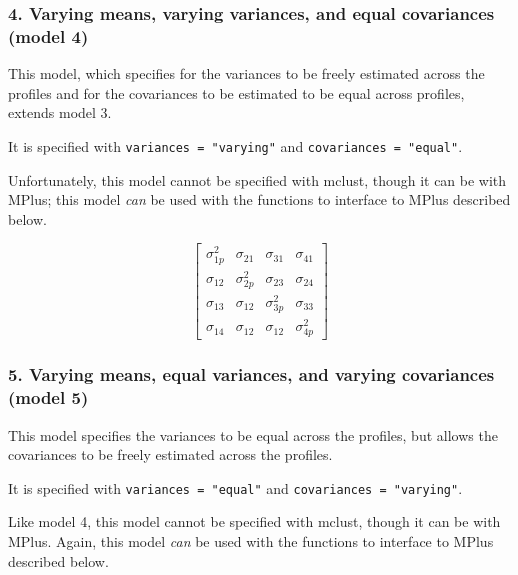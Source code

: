 \documentclass[man]{apa6}
\begin{document}
\hypertarget{varying-means-varying-variances-and-equal-covariances-model-4}{%
\subsubsection{4. Varying means, varying variances, and equal covariances (model 4)}\label{varying-means-varying-variances-and-equal-covariances-model-4}}

This model, which specifies for the variances to be freely estimated across the profiles and for the covariances to be estimated to be equal across profiles, extends model 3.

It is specified with \texttt{variances\ =\ "varying"} and \texttt{covariances\ =\ "equal"}.

Unfortunately, this model cannot be specified with mclust, though it can be with MPlus; this model \emph{can} be used with the functions to interface to MPlus described below.

\[
\left[ \begin{matrix} { \sigma  }_{ 1p }^{ 2 } & { \sigma  }_{ 21 } & { \sigma  }_{ 31 } & { \sigma  }_{ 41 } \\ { \sigma  }_{ 12 } & { \sigma  }_{ 2p }^{ 2 } & { \sigma  }_{ 23 } & { \sigma  }_{ 24 } \\ { \sigma  }_{ 13 } & { \sigma  }_{ 12 } & { \sigma  }_{ 3p }^{ 2 } & { \sigma  }_{ 33 } \\ { \sigma  }_{ 14 } & { \sigma  }_{ 12 } & { \sigma  }_{ 12 } & { \sigma  }_{ 4p }^{ 2 } \end{matrix} \right] 
\]

\hypertarget{varying-means-equal-variances-and-varying-covariances-model-5}{%
\subsubsection{5. Varying means, equal variances, and varying covariances (model 5)}\label{varying-means-equal-variances-and-varying-covariances-model-5}}

This model specifies the variances to be equal across the profiles, but allows the covariances to be freely estimated across the profiles.

It is specified with \texttt{variances\ =\ "equal"} and \texttt{covariances\ =\ "varying"}.

Like model 4, this model cannot be specified with mclust, though it can be with MPlus. Again, this model \emph{can} be used with the functions to interface to MPlus described below.
\end{document}
